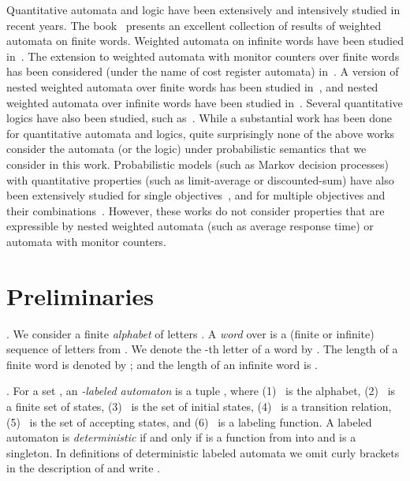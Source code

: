 \documentclass{lmcs}
\newcommand{\Paragraph}[1]{\noindent{\textbf{#1}}}
\begin{document}
\smallskip{}
Quantitative automata and logic have been extensively and intensively
studied in recent years.
The book~\cite{Droste:2009:HWA:1667106} presents an excellent collection of results
of weighted automata on finite words.
Weighted automata on infinite words have been studied in~\cite{Chatterjee08quantitativelanguages,DBLP:journals/corr/abs-1007-4018,DrosteR06}.
The extension to weighted automata with monitor counters over finite words has been considered (under the name of
cost register automata) in~\cite{DBLP:conf/lics/AlurDDRY13}.
A version of nested weighted automata over finite words has been
studied in~\cite{bollig2010pebble}, and nested weighted automata over
infinite words have been studied in~\cite{nested}.
Several quantitative logics have also been studied, such as~\cite{BokerCHK14,BouyerMM14,AlmagorBK14}.
While a substantial work has been done for quantitative automata and logics, quite surprisingly
none of the above works consider the automata (or the logic) under probabilistic semantics that
we consider in this work.
Probabilistic models (such as Markov decision processes) with quantitative properties
(such as limit-average or discounted-sum) have also been extensively studied for
single objectives~\cite{filar,Puterman}, and for multiple objectives and their
combinations~\cite{CMH06,Cha07,CFW13,BBCFK11,CKK15,Forejt,FKN11,CD11,Baier-CSL-LICS-1,Baier-CSL-LICS-2}.
However, these works do not consider properties that are expressible by nested weighted
automata (such as average response time) or automata with monitor counters.








\section{Preliminaries}
\Paragraph{Words}.
We consider a finite \emph{alphabet} of letters .
A \emph{word} over  is a (finite or infinite) sequence of letters from .
We denote the -th letter of a word  by .
The length of a finite word  is denoted by ; and the length of an infinite word
 is .

\smallskip
\Paragraph{Labeled automata}. For a set , an \emph{-labeled automaton}  is a tuple
, where
(1)~ is the alphabet,
(2)~ is a finite set of states,
(3)~ is the set of initial states,
(4)~ is a transition relation,
(5)~ is the set of accepting states,
and
(6)~ is a labeling function.
A labeled automaton  is
\emph{deterministic} if and only if
 is a function from  into 
and  is a singleton.
In definitions of deterministic labeled automata we omit curly brackets in the description of 
and write .
\end{document}
